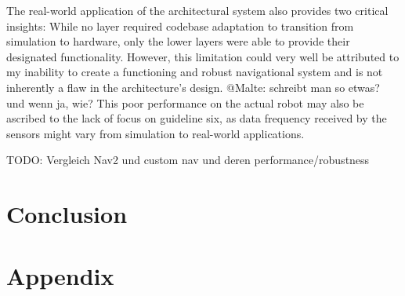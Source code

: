 \documentclass[%
paper=A4,               %
twoside=true,           %
openright,              %
11pt,                   %
bibliography=totoc,     %
titlepage=on,           %
DIV=12,                 %
BCOR=1.5cm,             %
parskip=half,            %
final
]{scrreprt}
\begin{document}
	The real-world application of the architectural system also provides two critical insights: While no layer required codebase adaptation to transition from simulation to hardware, only the lower layers were able to provide their designated functionality. However, this limitation could very well be attributed to my inability to create a functioning and robust navigational system and is not inherently a flaw in the architecture's design. {\color{red} @Malte: schreibt man so etwas? und wenn ja, wie?} \newline 
	This poor performance on the actual robot may also be ascribed to the lack of focus on guideline six, as data frequency received by the sensors might vary from simulation to real-world applications.
	
	TODO: Vergleich Nav2 und custom nav und deren performance/robustness
	
	

	\chapter{Conclusion}
	
	
	
	
	\printbibliography
	
	\chapter*{Appendix}
		
\end{document}

